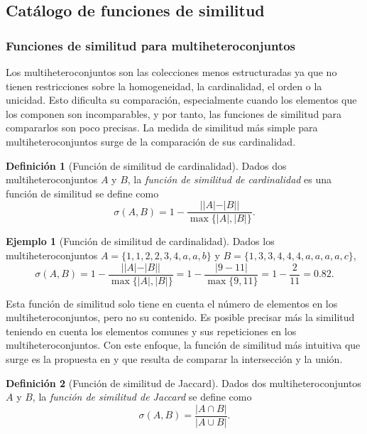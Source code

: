 \documentclass[a4paper,10pt,twoside]{article}
\theoremstyle{definition}
\newtheorem{definition}{Definición}
\newtheorem{example}{Ejemplo}
\begin{document}
\subsection{Catálogo de funciones de similitud}

\subsubsection{Funciones de similitud para multiheteroconjuntos}
\label{sec:sim-multiheteroconjuntos}

Los multiheteroconjuntos son las colecciones menos estructuradas ya que no tienen restricciones sobre la homogeneidad, la cardinalidad, el orden o la unicidad.
Esto dificulta su comparación, especialmente cuando los elementos que los componen son incomparables, y por tanto, las funciones
de similitud para compararlos son poco precisas.
La medida de similitud más simple para multiheteroconjuntos surge de la comparación de sus cardinalidad.

\begin{definition}[Función de similitud de cardinalidad]
Dados dos multiheteroconjuntos $A$ y $B$, la \emph{función de similitud de cardinalidad} es una función de similitud se define como 
\[
\sigma(A,B)= 1-\frac{||A|-|B||}{\max\{|A|,|B|\}}.
\]
\end{definition}

\begin{example}[Función de similitud de cardinalidad]
Dados los multiheteroconjuntos $A=\{1,1,2,\allowbreak 2,3,4,a,a,b\}$ y $B=\{1,3,3,4,4,4,a,a,a,a,c\}$,
\[
\sigma(A,B) = 1 - \frac{||A|-|B||}{\max\{|A|,|B|\}} = 1-\frac{|9-11|}{\max\{9,11\}} = 1- \frac{2}{11} = 0.82.
\]
\end{example}

Esta función de similitud solo tiene en cuenta el número de elementos en los multiheteroconjuntos, pero no su contenido.
Es posible precisar más la similitud teniendo en cuenta los elementos comunes y sus repeticiones en los multiheteroconjuntos.
Con este enfoque, la función de similitud más intuitiva que surge es la propuesta en \cite{jaccard1901etude} y que resulta de comparar la intersección y la unión.

\begin{definition}[Función de similitud de Jaccard]
Dados dos multiheteroconjuntos $A$ y $B$, la \emph{función de similitud de Jaccard} se define como
\[
\sigma(A,B)=\frac{|A\cap B|}{|A\cup B|}.
\]
\end{definition}
\end{document}
